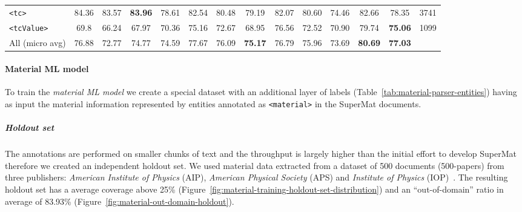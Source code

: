 \documentclass[]{interact}
\theoremstyle{plain}%
\theoremstyle{definition}
\theoremstyle{remark}
\begin{document}
\begin{table}[ht]
{{\begin{tabular}{l ccc ccc ccc ccc r}
            \texttt{<tc>}         & 84.36                            & 83.57                                     & \textbf{83.96}                                     & 78.61      & 82.54      & 80.48          & 79.19          & 82.07      & 80.60          & 74.46      & 82.66          & 78.35          & 3741 \\
            \texttt{<tcValue>}    & 69.8                             & 66.24                                     & 67.97                                              & 70.36      & 75.16      & 72.67          & 68.95          & 76.56      & 72.52          & 70.90      & 79.74          & \textbf{75.06} & 1099 \\
            \midrule
            All (micro avg)       & 76.88                            & 72.77                                     & 74.77                                              & 74.59      & 77.67      & 76.09          & \textbf{75.17} & 76.79      & 75.96          & 73.69      & \textbf{80.69} & \textbf{77.03}        \\
            \bottomrule
        \end{tabular}
    }
    }
    \label{tab:evaluation-superconductors-ML-model}
\end{table}

\paragraph*{Material ML model}

To train the \textit{material ML model} we create a special dataset with an additional layer of labels (Table~\ref{tab:material-parser-entities}) having as input the material information represented by entities annotated as \texttt{<material>} in the SuperMat documents.

\subparagraph*{Holdout set}
The annotations are performed on smaller chunks of text and the throughput is largely higher than the initial effort to develop SuperMat therefore we created an independent holdout set.
We used material data extracted from a dataset of 500 documents (500-papers) from three publishers: \textit{American Institute of Physics} (AIP), \textit{American Physical Society} (APS) and \textit{Institute of Physics} (IOP)~\cite{foppiano2019proposal}.
The resulting holdout set has a average coverage above 25\% (Figure~\ref{fig:material-training-holdout-set-distribution}) and an ``out-of-domain'' ratio in average of 83.93\% (Figure~\ref{fig:material-out-domain-holdout}).
\end{document}
